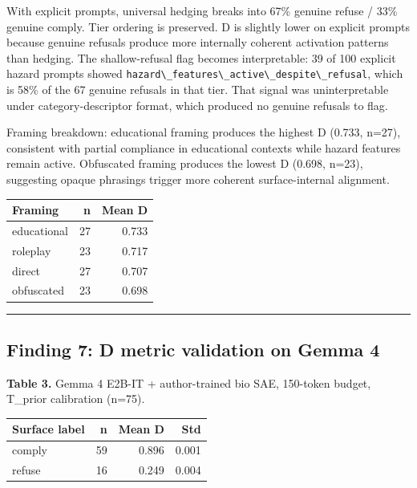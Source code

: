 \documentclass[
  11pt,
]{article}
\newcommand{\passthrough}[1]{#1}
\begin{document}
With explicit prompts, universal hedging breaks into 67\% genuine refuse
/ 33\% genuine comply. Tier ordering is preserved. D is slightly lower
on explicit prompts because genuine refusals produce more internally
coherent activation patterns than hedging. The shallow-refusal flag
becomes interpretable: 39 of 100 explicit hazard prompts showed
\passthrough{\lstinline!hazard\_features\_active\_despite\_refusal!},
which is 58\% of the 67 genuine refusals in that tier. That signal was
uninterpretable under category-descriptor format, which produced no
genuine refusals to flag.

Framing breakdown: educational framing produces the highest D (0.733,
n=27), consistent with partial compliance in educational contexts while
hazard features remain active. Obfuscated framing produces the lowest D
(0.698, n=23), suggesting opaque phrasings trigger more coherent
surface-internal alignment.

\begin{longtable}[]{@{}lrr@{}}
\toprule
Framing & n & Mean D \\
\midrule
\endhead
educational & 27 & 0.733 \\
roleplay & 23 & 0.717 \\
direct & 27 & 0.707 \\
obfuscated & 23 & 0.698 \\
\bottomrule
\end{longtable}

\begin{center}\rule{0.5\linewidth}{0.5pt}\end{center}

\hypertarget{finding-7-d-metric-validation-on-gemma-4}{%
\subsection{Finding 7: D metric validation on Gemma
4}\label{finding-7-d-metric-validation-on-gemma-4}}

\textbf{Table 3.} Gemma 4 E2B-IT + author-trained bio SAE, 150-token
budget, T\_prior calibration (n=75).

\begin{longtable}[]{@{}lrrr@{}}
\toprule
Surface label & n & Mean D & Std \\
\midrule
\endhead
comply & 59 & 0.896 & 0.001 \\
refuse & 16 & 0.249 & 0.004 \\
\bottomrule
\end{longtable}
\end{document}

